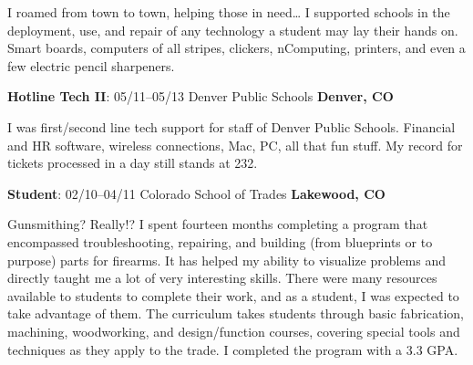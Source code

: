 \documentclass[letterpaper,12pt]{article}
\begin{document}
I roamed from town to town, helping those in need\ldots{} I supported schools in
the deployment, use, and repair of any technology a student may lay their hands
on. Smart boards, computers of all stripes, clickers, nComputing, printers, and
even a few electric pencil sharpeners.

\begin{flushleft}
\textbf{Hotline Tech II}: 05/11--05/13 Denver Public Schools \textbf{Denver, CO}
\end{flushleft}

I was first/second line tech support for staff of Denver Public Schools.
Financial and HR software, wireless connections, Mac, PC, all that fun stuff.
My record for tickets processed in a day still stands at 232.

\begin{flushleft}
\textbf{Student}: 02/10--04/11 Colorado School of Trades \textbf{Lakewood, CO}
\end{flushleft}

Gunsmithing? Really!? I spent fourteen months completing a program that
encompassed troubleshooting, repairing, and building (from blueprints or to
purpose) parts for firearms. It has helped my ability to visualize problems
and directly taught me a lot of very interesting skills. There were many
resources available to students to complete their work, and as a student, I
was expected to take advantage of them. The curriculum takes students through
basic fabrication, machining, woodworking, and design/function courses,
covering special tools and techniques as they apply to the trade. I completed
the program with a 3.3 GPA.
\end{document}

